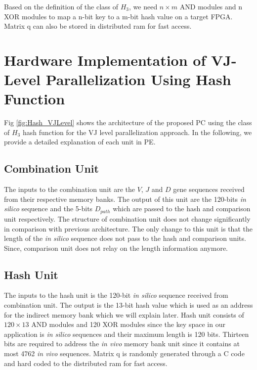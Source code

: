 Based on the definition of the class of $H_3$, we need $n \times m$ AND modules and n XOR modules to map a n-bit key to a m-bit hash value on a target FPGA. Matrix q can also be stored in distributed ram for fast access. 

\section{Hardware Implementation of VJ-Level Parallelization Using Hash Function}\label{sec:HashVJ-level}
Fig \ref{fig:Hash_VJLevel} shows the architecture of the proposed PC using the class of $H_3$ hash function for the VJ level parallelization approach. In the following, we provide a detailed explanation of each unit in PE. 

\subsection{Combination Unit}
The inputs to the combination unit are the $V$, $J$ and $D$ gene sequences received from their respective memory banks. The output of this unit are the 120-bits \emph{in silico} sequence and the 5-bits $D_{path}$ which are passed to the hash and comparison unit respectively. The structure of combination unit does not change significantly in comparison with previous architecture. The only change to this unit is that the length of the \emph{in silico} sequence does not pass to the hash and comparison units. Since, comparison unit does not relay on the length information anymore. 
 
\subsection{Hash Unit}
The inputs to the hash unit is the 120-bit \emph{in silico} sequence received from combination unit. The output is the 13-bit hash value which is used as an address for the indirect memory bank which we will explain later. Hash unit consists of  $120 \times 13$ AND modules and 120 XOR modules since the key space in our application is \emph{in silico} sequences and their maximum length is 120 bits. Thirteen bits are required to address the \emph{in vivo} memory bank unit since it contains at most 4762 \emph{in vivo} sequences. Matrix q is randomly generated through a C code and hard coded to the distributed ram for fast access. 

